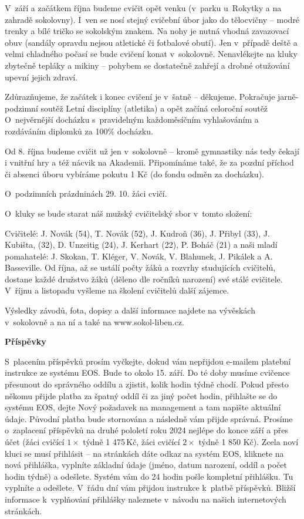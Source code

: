 \documentclass[11pt]{article}
\begin{document}
V~září a začátkem října budeme cvičit opět venku (v~parku u~Rokytky a na zahradě sokolovny). I~ven se nosí stejný cvičební úbor jako do tělocvičny – modré trenky a bílé tričko se sokolským znakem. Na nohy je nutná vhodná zavazovací obuv (sandály opravdu nejsou atletické či fotbalové obutí). Jen v~případě deště a velmi chladného počasí se bude cvičení konat v~sokolovně. Nenavlékejte na kluky zbytečně tepláky a mikiny – pohybem se dostatečně zahřejí a drobné otužování upevní jejich zdraví. 

Zdůrazňujeme, že začátek i konec cvičení je v~šatně – děkujeme. Pokračuje jarně-podzimní soutěž Letní disciplíny (atletika) a opět začíná celoroční soutěž O~nejvěrnější docházku s~pravidelným každoměsíčním vyhlašováním a rozdáváním diplomků za 100\% docházku. 

Od 8. října budeme cvičit už jen v~sokolovně – kromě gymnastiky nás tedy čekají i vnitřní hry a též nácvik na Akademii. Připomínáme také, že za pozdní příchod či absenci úboru vybíráme pokutu 1 Kč (do fondu odměn za docházku). 

O~podzimních prázdninách 29. 10. žáci cvičí.

O~kluky se bude starat náš mužský cvičitelský sbor v~tomto složení:

Cvičitelé: J. Novák (54), T. Novák (52), J. Kudroň (36), J. Přibyl (33), J. Kubišta, (32), D. Unzeitig (24), J. Kerhart (22), P. Boháč (21) a naši mladí pomahatelé: J. Skokan, T. Kléger, V. Novák, V. Blahunek, J. Pikálek a A. Basseville. Od října, až se ustálí počty žáků a rozvrhy studujících cvičitelů, dostane každé družstvo žáků (děleno dle ročníků narození) své stálé cvičitele. V~říjnu a listopadu vyšleme na školení cvičitelů další zájemce.

Výsledky závodů, fota, dopisy a další informace najdete na vývěskách v~sokolovně a na ní a také na www.sokol-liben.cz.


\vspace*{12pt}
\begin{center}
  \noindent\textbf{Příspěvky}
\end{center}
\vspace*{6pt}
S~placením příspěvků prosím vyčkejte, dokud vám nepřijdou e-mailem platební instrukce ze systému EOS. Bude to okolo 15. září. Do té doby musíme cvičence přesunout do správného oddílu a zjistit, kolik hodin týdně chodí. Pokud přesto někomu přijde platba za špatný oddíl či za jiný počet hodin, přihlašte se do systému EOS, dejte \luv{}Nový požadavek na management\ruv{} a tam napište aktuální údaje. Původní platba bude stornována a následně vám přijde správná. Prosíme o~zaplacení příspěvků na druhé pololetí roku 2024 nejlépe do konce září a přes účet (žáci cvičící $1\times$ týdně 1 475\,Kč, žáci cvičící $2\times$ týdně 1 850 Kč). Zcela noví kluci se musí přihlásit – na stránkách dáte odkaz na systém EOS, kliknete na nová přihláška, vyplníte základní údaje (jméno, datum narození, oddíl a počet hodin týdně) a odešlete. Systém vám do 24 hodin pošle kompletní přihlášku. Tu vyplníte a odešlete. V~řádu dní vám přijdou instrukce k~platbě příspěvků. Bližší informace k~vyplňování přihlášky naleznete v~návodu na našich internetových stránkách. 
\end{document}
